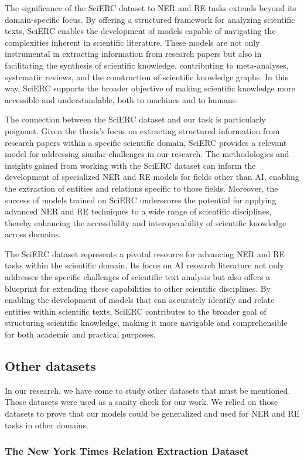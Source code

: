 The significance of the SciERC dataset to NER and RE tasks extends beyond its domain-specific focus. By offering a structured framework for analyzing scientific texts, SciERC enables the development of models capable of navigating the complexities inherent in scientific literature. These models are not only instrumental in extracting information from research papers but also in facilitating the synthesis of scientific knowledge, contributing to meta-analyses, systematic reviews, and the construction of scientific knowledge graphs. In this way, SciERC supports the broader objective of making scientific knowledge more accessible and understandable, both to machines and to humans.

The connection between the SciERC dataset and our task is particularly poignant. Given the thesis's focus on extracting structured information from research papers within a specific scientific domain, SciERC provides a relevant model for addressing similar challenges in our research. The methodologies and insights gained from working with the SciERC dataset can inform the development of specialized NER and RE models for fields other than AI, enabling the extraction of entities and relations specific to those fields. Moreover, the success of models trained on SciERC underscores the potential for applying advanced NER and RE techniques to a wide range of scientific disciplines, thereby enhancing the accessibility and interoperability of scientific knowledge across domains.

The SciERC dataset represents a pivotal resource for advancing NER and RE tasks within the scientific domain. Its focus on AI research literature not only addresses the specific challenges of scientific text analysis but also offers a blueprint for extending these capabilities to other scientific disciplines. By enabling the development of models that can accurately identify and relate entities within scientific texts, SciERC contributes to the broader goal of structuring scientific knowledge, making it more navigable and comprehensible for both academic and practical purposes.
\subsection{Other datasets}
In our research, we have come to study other datasets that must be mentioned. Those datasets were used as a sanity check for our work. We relied on those datasets to prove that our models could be generalized and used for NER and RE tasks in other domains.
\subsubsection{The New York Times Relation Extraction Dataset}


